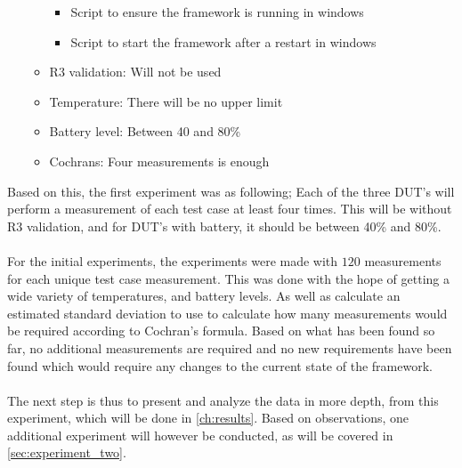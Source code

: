 \begin{itemize}
\begin{itemize}
\begin{itemize}
            \item Script to ensure the framework is running in windows
            \item Script to start the framework after a restart in windows
        \end{itemize}
        \item R3 validation: Will not be used
        \item Temperature: There will be no upper limit
        \item Battery level: Between 40 and 80\%
        \item Cochrans: Four measurements is enough
    \end{itemize}
\end{itemize}

Based on this, the first experiment was as following; Each of the three DUT's will perform a measurement of each test case at least four times. This will be without R3 validation, and for DUT's with battery, it should be between 40\% and 80\%.

\paragraph*{}
For the initial experiments, the experiments were made with $120$ measurements for each unique test case measurement. This was done with the hope of getting a wide variety of temperatures, and battery levels. As well as calculate an estimated standard deviation to use to calculate how many measurements would be required according to Cochran's formula. Based on what has been found so far, no additional measurements are required and no new requirements have been found which would require any changes to the current state of the framework.

\paragraph*{}
The next step is thus to present and analyze the data in more depth, from this experiment, which will be done in \cref{ch:results}. Based on observations, one additional experiment will however be conducted, as will be covered in \cref{sec:experiment_two}.